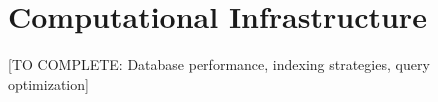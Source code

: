 \section{Computational Infrastructure}

[TO COMPLETE: Database performance, indexing strategies, query optimization]